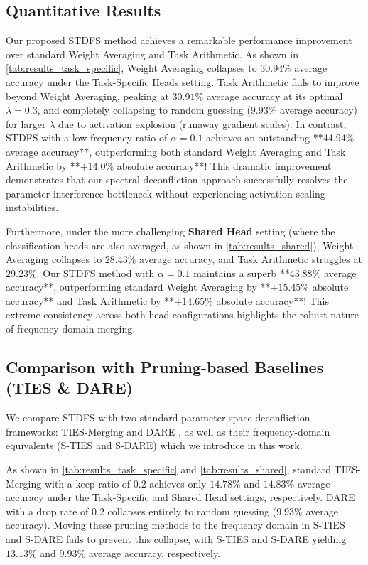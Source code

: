 \documentclass{article}
\theoremstyle{plain}
\theoremstyle{definition}
\theoremstyle{remark}
\begin{document}
\subsection{Quantitative Results}
Our proposed STDFS method achieves a remarkable performance improvement over standard Weight Averaging and Task Arithmetic. As shown in \cref{tab:results_task_specific}, Weight Averaging collapses to $30.94\%$ average accuracy under the Task-Specific Heads setting. Task Arithmetic fails to improve beyond Weight Averaging, peaking at $30.91\%$ average accuracy at its optimal $\lambda=0.3$, and completely collapsing to random guessing ($9.93\%$ average accuracy) for larger $\lambda$ due to activation explosion (runaway gradient scales). In contrast, STDFS with a low-frequency ratio of $\alpha = 0.1$ achieves an outstanding **$44.94\%$ average accuracy**, outperforming both standard Weight Averaging and Task Arithmetic by **$+14.0\%$ absolute accuracy**! This dramatic improvement demonstrates that our spectral deconfliction approach successfully resolves the parameter interference bottleneck without experiencing activation scaling instabilities.

Furthermore, under the more challenging \textbf{Shared Head} setting (where the classification heads are also averaged, as shown in \cref{tab:results_shared}), Weight Averaging collapses to $28.43\%$ average accuracy, and Task Arithmetic struggles at $29.23\%$. Our STDFS method with $\alpha = 0.1$ maintains a superb **$43.88\%$ average accuracy**, outperforming standard Weight Averaging by **$+15.45\%$ absolute accuracy** and Task Arithmetic by **$+14.65\%$ absolute accuracy**! This extreme consistency across both head configurations highlights the robust nature of frequency-domain merging.

\subsection{Comparison with Pruning-based Baselines (TIES \& DARE)}
We compare STDFS with two standard parameter-space deconfliction frameworks: TIES-Merging \cite{yadav2023ties} and DARE \cite{yu2024dare}, as well as their frequency-domain equivalents (S-TIES and S-DARE) which we introduce in this work.

As shown in \cref{tab:results_task_specific} and \cref{tab:results_shared}, standard TIES-Merging with a keep ratio of $0.2$ achieves only $14.78\%$ and $14.83\%$ average accuracy under the Task-Specific and Shared Head settings, respectively. DARE with a drop rate of $0.2$ collapses entirely to random guessing ($9.93\%$ average accuracy). Moving these pruning methods to the frequency domain in S-TIES and S-DARE fails to prevent this collapse, with S-TIES and S-DARE yielding $13.13\%$ and $9.93\%$ average accuracy, respectively.
\end{document}
